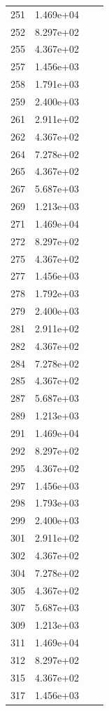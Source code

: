 \documentclass[12pt]{article}
\begin{document}
\begin{longtable}{@{}cccc@{}}
251 & 1.469e+04 &  &  \\
252 & 8.297e+02 &  &  \\
255 & 4.367e+02 &  &  \\
257 & 1.456e+03 &  &  \\
258 & 1.791e+03 &  &  \\
259 & 2.400e+03 &  &  \\
261 & 2.911e+02 &  &  \\
262 & 4.367e+02 &  &  \\
264 & 7.278e+02 &  &  \\
265 & 4.367e+02 &  &  \\
267 & 5.687e+03 &  &  \\
269 & 1.213e+03 &  &  \\
271 & 1.469e+04 &  &  \\
272 & 8.297e+02 &  &  \\
275 & 4.367e+02 &  &  \\
277 & 1.456e+03 &  &  \\
278 & 1.792e+03 &  &  \\
279 & 2.400e+03 &  &  \\
281 & 2.911e+02 &  &  \\
282 & 4.367e+02 &  &  \\
284 & 7.278e+02 &  &  \\
285 & 4.367e+02 &  &  \\
287 & 5.687e+03 &  &  \\
289 & 1.213e+03 &  &  \\
291 & 1.469e+04 &  &  \\
292 & 8.297e+02 &  &  \\
295 & 4.367e+02 &  &  \\
297 & 1.456e+03 &  &  \\
298 & 1.793e+03 &  &  \\
299 & 2.400e+03 &  &  \\
301 & 2.911e+02 &  &  \\
302 & 4.367e+02 &  &  \\
304 & 7.278e+02 &  &  \\
305 & 4.367e+02 &  &  \\
307 & 5.687e+03 &  &  \\
309 & 1.213e+03 &  &  \\
311 & 1.469e+04 &  &  \\
312 & 8.297e+02 &  &  \\
315 & 4.367e+02 &  &  \\
317 & 1.456e+03 &  &  \\

\end{longtable}
\end{document}
